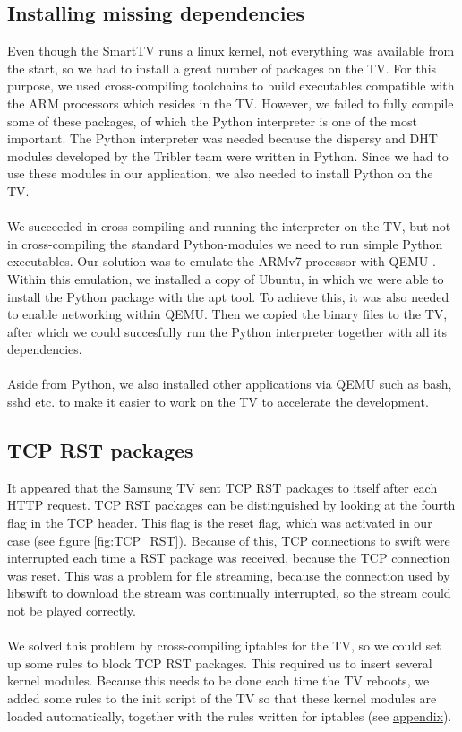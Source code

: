 \subsection{Installing missing dependencies}
Even though the SmartTV runs a linux kernel, not everything was available from the start, so we had to install a great number of packages on the TV.
For this purpose, we used cross-compiling toolchains to build executables compatible with the ARM \cite{arm} processors which resides in the TV. However, we failed
to fully compile some of these packages, of which the Python interpreter is one of the most important. The Python interpreter was needed because the dispersy and DHT modules 
developed by the Tribler team were written in Python. Since we had to use these modules in our application, we also needed to install Python on the TV. 
\\\\
We succeeded in cross-compiling and running the interpreter on the TV, but not in cross-compiling the standard Python-modules we need to run simple Python executables.
Our solution was to emulate the ARMv7 processor with QEMU \cite{qemu}. Within this emulation, we installed a copy of Ubuntu, \cite{ubuntu} in which we were able to install the Python package with the apt tool.
To achieve this, it was also needed to enable networking within QEMU. \cite{qemu-network} Then we copied the binary files to the TV, after which we could succesfully run the Python interpreter together with all its dependencies.
\\\\
Aside from Python, we also installed other applications via QEMU such as bash, sshd etc. to make it easier to work on the TV to accelerate the development.

\subsection{TCP RST packages}
It appeared that the Samsung TV sent TCP RST packages to itself after each HTTP request. TCP RST packages can be distinguished by looking at the fourth flag in the TCP header. This flag is the reset flag, which was activated in our case (see figure \ref{fig:TCP_RST}). Because of this, TCP connections to swift were interrupted each time a RST package was received, because the TCP connection was reset. This was a problem for file streaming, because the connection used by libswift to download the stream was continually interrupted, so the stream could not be played correctly. 
\\\\
We solved this problem by cross-compiling iptables\cite{iptables} for the TV, so we could set up some rules to block TCP RST packages. This required us to insert several kernel modules. Because this needs to be done each time the TV reboots, we added some rules to the init script of the TV so that these kernel modules are loaded automatically, together with the rules written for iptables (see \hyperref[sec:vusb_init]{appendix}).

